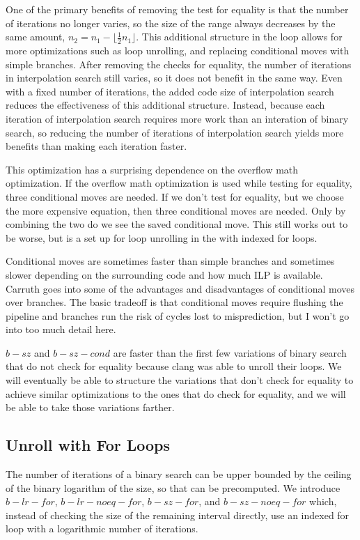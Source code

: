 \documentclass[twocolumn]{article}
\begin{document}
One of the primary benefits of removing the test for equality is that the number of iterations no longer varies, so the size of the range always decreases by the same amount, $n_2 = n_1 - \lfloor \frac{1}{2}n_1 \rfloor$. This additional structure in the loop allows for more optimizations such as loop unrolling, and replacing conditional moves with simple branches. After removing the checks for equality, the number of iterations in interpolation search still varies, so it does not benefit in the same way. Even with a fixed number of iterations, the added code size of interpolation search reduces the effectiveness of this additional structure. Instead, because each iteration of interpolation search requires more work than an interation of binary search, so reducing the number of iterations of interpolation search yields more benefits than making each iteration faster.

This optimization has a surprising dependence on the overflow math optimization. If the overflow math optimization is used while testing for equality, three conditional moves are needed. If we don't test for equality, but we choose the more expensive equation, then three conditional moves are needed. Only by combining the two do we see the saved conditional move. This still works out to be worse, but is a set up for loop unrolling in the with indexed for loops.

Conditional moves are sometimes faster than simple branches and sometimes slower depending on the surrounding code and how much ILP is available. Carruth \cite{carruth} goes into some of the advantages and disadvantages of conditional moves over branches. The basic tradeoff is that conditional moves require flushing the pipeline and branches run the risk of cycles lost to misprediction, but I won't go into too much detail here.

$b-sz$ and $b-sz-cond$ are faster than the first few variations of binary search that do not check for equality because clang was able to unroll their loops. We will eventually be able to structure the variations that don't check for equality to achieve similar optimizations to the ones that do check for equality, and we will be able to take those variations farther.

\subsection{Unroll with For Loops}
The number of iterations of a binary search can be upper bounded by the ceiling of the binary logarithm of the size, so that can be precomputed. We introduce $b-lr-for$, $b-lr-noeq-for$, $b-sz-for$, and $b-sz-noeq-for$ which, instead of checking the size of the remaining interval directly, use an indexed for loop with a logarithmic number of iterations.
\end{document}
